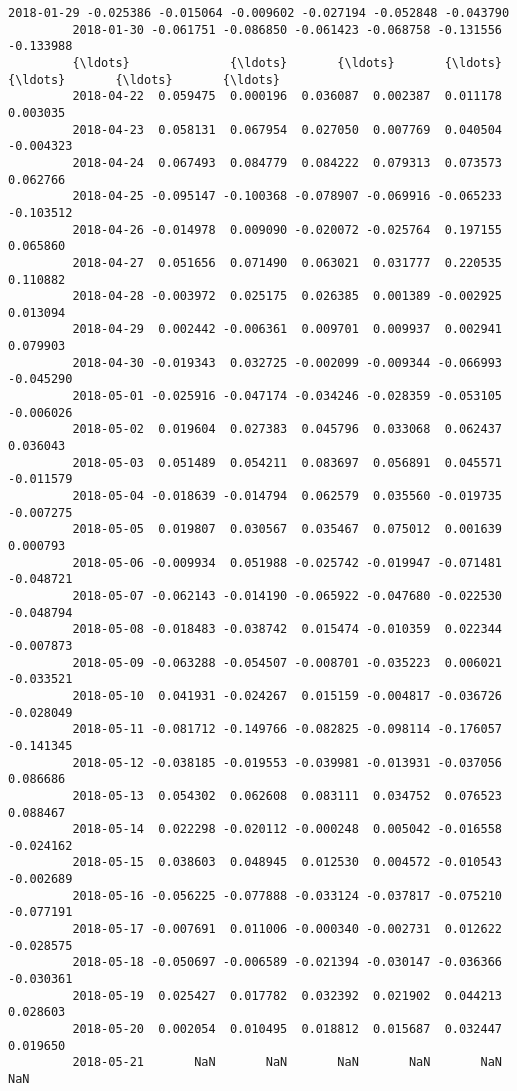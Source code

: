 \documentclass[11pt]{article}
\begin{document}
\begin{Verbatim}[commandchars=\\\{\}]
         2018-01-29 -0.025386 -0.015064 -0.009602 -0.027194 -0.052848 -0.043790   
         2018-01-30 -0.061751 -0.086850 -0.061423 -0.068758 -0.131556 -0.133988   
         {\ldots}              {\ldots}       {\ldots}       {\ldots}       {\ldots}       {\ldots}       {\ldots}   
         2018-04-22  0.059475  0.000196  0.036087  0.002387  0.011178  0.003035   
         2018-04-23  0.058131  0.067954  0.027050  0.007769  0.040504 -0.004323   
         2018-04-24  0.067493  0.084779  0.084222  0.079313  0.073573  0.062766   
         2018-04-25 -0.095147 -0.100368 -0.078907 -0.069916 -0.065233 -0.103512   
         2018-04-26 -0.014978  0.009090 -0.020072 -0.025764  0.197155  0.065860   
         2018-04-27  0.051656  0.071490  0.063021  0.031777  0.220535  0.110882   
         2018-04-28 -0.003972  0.025175  0.026385  0.001389 -0.002925  0.013094   
         2018-04-29  0.002442 -0.006361  0.009701  0.009937  0.002941  0.079903   
         2018-04-30 -0.019343  0.032725 -0.002099 -0.009344 -0.066993 -0.045290   
         2018-05-01 -0.025916 -0.047174 -0.034246 -0.028359 -0.053105 -0.006026   
         2018-05-02  0.019604  0.027383  0.045796  0.033068  0.062437  0.036043   
         2018-05-03  0.051489  0.054211  0.083697  0.056891  0.045571 -0.011579   
         2018-05-04 -0.018639 -0.014794  0.062579  0.035560 -0.019735 -0.007275   
         2018-05-05  0.019807  0.030567  0.035467  0.075012  0.001639  0.000793   
         2018-05-06 -0.009934  0.051988 -0.025742 -0.019947 -0.071481 -0.048721   
         2018-05-07 -0.062143 -0.014190 -0.065922 -0.047680 -0.022530 -0.048794   
         2018-05-08 -0.018483 -0.038742  0.015474 -0.010359  0.022344 -0.007873   
         2018-05-09 -0.063288 -0.054507 -0.008701 -0.035223  0.006021 -0.033521   
         2018-05-10  0.041931 -0.024267  0.015159 -0.004817 -0.036726 -0.028049   
         2018-05-11 -0.081712 -0.149766 -0.082825 -0.098114 -0.176057 -0.141345   
         2018-05-12 -0.038185 -0.019553 -0.039981 -0.013931 -0.037056  0.086686   
         2018-05-13  0.054302  0.062608  0.083111  0.034752  0.076523  0.088467   
         2018-05-14  0.022298 -0.020112 -0.000248  0.005042 -0.016558 -0.024162   
         2018-05-15  0.038603  0.048945  0.012530  0.004572 -0.010543 -0.002689   
         2018-05-16 -0.056225 -0.077888 -0.033124 -0.037817 -0.075210 -0.077191   
         2018-05-17 -0.007691  0.011006 -0.000340 -0.002731  0.012622 -0.028575   
         2018-05-18 -0.050697 -0.006589 -0.021394 -0.030147 -0.036366 -0.030361   
         2018-05-19  0.025427  0.017782  0.032392  0.021902  0.044213  0.028603   
         2018-05-20  0.002054  0.010495  0.018812  0.015687  0.032447  0.019650   
         2018-05-21       NaN       NaN       NaN       NaN       NaN       NaN   
         

\end{Verbatim}
\end{document}
